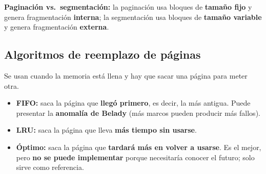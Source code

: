 \documentclass[11pt,a4paper]{article}
\newcommand{\clave}[1]{\textbf{\color{acento}#1}}
\begin{document}
\begin{nota}
\textbf{Paginación vs.\ segmentación:} la paginación usa bloques de \textbf{tamaño fijo} y genera fragmentación
\textbf{interna}; la segmentación usa bloques de \textbf{tamaño variable} y genera fragmentación \textbf{externa}.
\end{nota}

\subsection{Algoritmos de reemplazo de páginas}
Se usan cuando la memoria está llena y hay que sacar una página para meter otra.
\begin{itemize}
  \item \clave{FIFO:} saca la página que \textbf{llegó primero}, es decir, la más antigua. Puede presentar la
        \textbf{anomalía de Belady} (más marcos pueden producir más fallos).
  \item \clave{LRU:} saca la página que lleva \textbf{más tiempo sin usarse}.
  \item \clave{Óptimo:} saca la página que \textbf{tardará más en volver a usarse}. Es el mejor, pero
        \textbf{no se puede implementar} porque necesitaría conocer el futuro; solo sirve como referencia.
\end{itemize}
\end{document}
